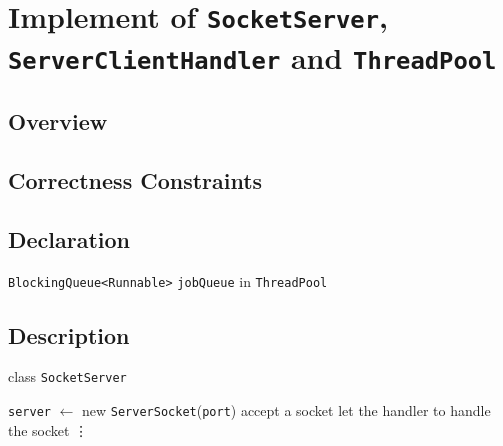 \documentclass{article}
\begin{document}
\section{Implement of \texttt{SocketServer}, \texttt{ServerClientHandler} and \texttt{ThreadPool}}
\subsection{Overview}
\subsection{Correctness Constraints}
\subsection{Declaration}
\begin{compactitem}
	\item \texttt{BlockingQueue<Runnable>} \texttt{jobQueue} in \texttt{ThreadPool}
\end{compactitem}
\subsection{Description}
\begin{algorithm}
    \caption{class \texttt{SocketServer}}
	\begin{algorithmic}
            \State \texttt{server} $\leftarrow$ new \texttt{ServerSocket}(\texttt{port})
        \EndProcedure
                \State accept a socket
                \State let the handler to handle the socket
            \EndWhile
            \State \vdots
        \EndProcedure
	\end{algorithmic}
\end{algorithm}
\end{document}
